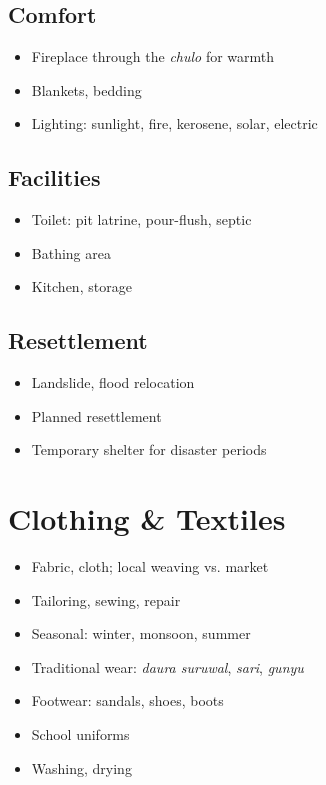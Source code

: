 \documentclass[11pt,a4paper]{article}
\begin{document}
\subsection{Comfort}
\begin{itemize}
    \item Fireplace through the \textit{chulo} for warmth
    \item Blankets, bedding
    \item Lighting: sunlight, fire, kerosene, solar, electric
\end{itemize}

\subsection{Facilities}
\begin{itemize}
    \item Toilet: pit latrine, pour-flush, septic
    \item Bathing area
    \item Kitchen, storage
\end{itemize}

\subsection{Resettlement}
\begin{itemize}
    \item Landslide, flood relocation
    \item Planned resettlement
    \item Temporary shelter for disaster periods
\end{itemize}

\section{Clothing \& Textiles}

\begin{itemize}
    \item Fabric, cloth; local weaving vs. market
    \item Tailoring, sewing, repair
    \item Seasonal: winter, monsoon, summer
    \item Traditional wear: \textit{daura suruwal}, \textit{sari}, \textit{gunyu}
    \item Footwear: sandals, shoes, boots
    \item School uniforms
    \item Washing, drying
\end{itemize}
\end{document}
